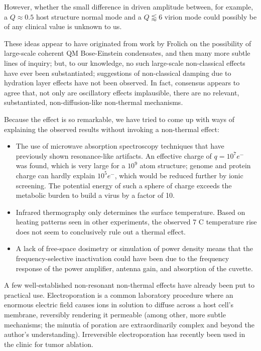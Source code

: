 \documentclass[paper.tex]{subfiles}
\begin{document}
However, whether the small difference in driven amplitude between, for example, a $Q\approx0.5$ host structure normal mode and a $Q\lessapprox6$ virion mode could possibly be of any clinical value is unknown to us. 



These ideas appear to have originated from work by Frolich\cite{Longrange1968}\cite{Evidence1983}\cite{Biological1980}\cite{Coherence1983} on the possibility of large-scale coherent QM Bose-Einstein condensates, and then many more subtle lines of inquiry\cite{Mechanisms1992}\cite{mechanisms1981}; but, to our knowledge, no such large-scale non-classical effects have ever been substantiated; suggestions of non-classical damping due to hydration layer effects have not been observed. In fact, consensus\cite{Exposure2009}\cite{ICNIRP2020}\cite{C95} appears to agree that, not only are oscillatory effects implausible, there are no relevant, substantiated, non-diffusion-like non-thermal mechanisms. 

Because the effect is so remarkable, we have tried to come up with ways of explaining the observed results without invoking a non-thermal effect:
\begin{itemize}
	\item The use of microwave absorption spectroscopy techniques that have previously shown resonance-like artifacts\cite{Resonances1987}. An effective charge of $q=10^7 e^-$ was found, which is very large for a $10^9$ atom structure; genome and protein charge can hardly explain $10^5 e^-$, which would be reduced further by ionic screening. The potential energy of such a sphere of charge exceeds the metabolic burden to build a virus by a factor of 10.
	\item Infrared thermography only determines the surface temperature. Based on heating patterns seen in other experiments\cite{Effects1950}, the observed 7 C temperature rise does not seem to conclusively rule out a thermal effect. 
	\item A lack of free-space dosimetry or simulation of power density means that the frequency-selective inactivation could have been due to the frequency response of the power amplifier, antenna gain, and absorption of the cuvette.
\end{itemize}


A few well-established non-resonant non-thermal effects have already been put to practical use. Electroporation is a common laboratory procedure where an enormous electric field causes ions in solution to diffuse across a host cell's membrane, reversibly rendering it permeable (among other, more subtle mechanisms; the minutia of poration are extraordinarily complex and beyond the author's understanding\cite{Theoretical2007}). Irreversible electroporation\cite{Irreversible2013} has recently been used in the clinic\cite{Nonthermal2013} for tumor ablation.%
\end{document}
